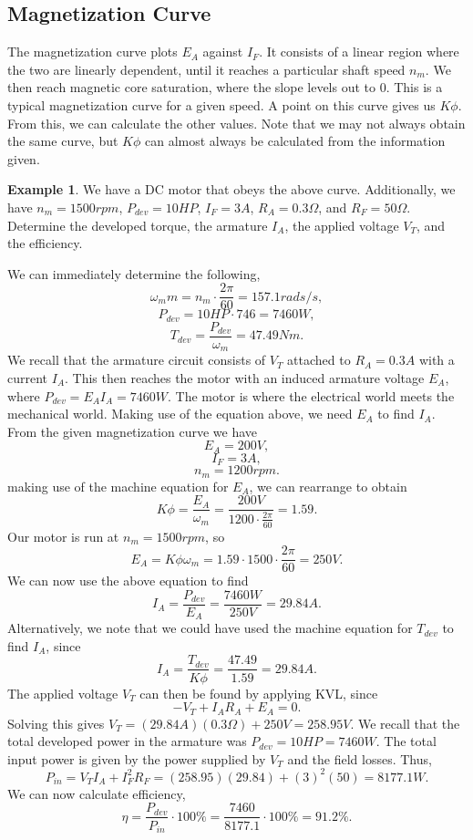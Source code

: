 \documentclass[11pt]{article}
\theoremstyle{plain} %
\theoremstyle{definition}
\theoremstyle{example}
\newtheorem*{example}{Example}
\theoremstyle{remark}
\begin{document}
\subsection{Magnetization Curve}
The magnetization curve plots $E_A$ against $I_F$. It consists of a linear region where the two are linearly dependent, until it reaches a particular shaft speed $n_m$. We then reach magnetic core saturation, where the slope levels out to 0. This is a typical magnetization curve for a given speed. A point on this curve gives us $K\phi$. From this, we can calculate the other values. Note that we may not always obtain the same curve, but $K\phi$ can almost always be calculated from the information given. 

\begin{example}
We have a DC motor that obeys the above curve. Additionally, we have $n_m=1500rpm$, $P_{dev}=10HP$, $I_F = 3A$, $R_A=0.3\Omega$, and $R_F = 50\Omega$. Determine the developed torque, the armature $I_A$, the applied voltage $V_T$, and the efficiency.
\end{example}
We can immediately determine the following,
$$\omega_mm = n_m\cdot \frac{2\pi}{60} = 157.1rads/s,$$
$$P_{dev}=10HP\cdot 746 = 7460W,$$
$$T_{dev} = \frac{P_{dev}}{\omega_m} = 47.49Nm.$$
We recall that the armature circuit consists of $V_T$ attached to $R_A=0.3A$ with a current $I_A$. This then reaches the motor with an induced armature voltage $E_A$, where $P_{dev} = E_AI_A = 7460W$. The motor is where the electrical world meets the mechanical world. Making use of the equation above, we need $E_A$ to find $I_A$. From the given magnetization curve we have 
$$E_A = 200V,$$
$$I_F = 3A,$$
$$n_m=1200rpm.$$
making use of the machine equation for $E_A$, we can rearrange to obtain 
$$K\phi = \frac{E_A}{\omega_m} = \frac{200V}{1200\cdot\frac{2\pi}{60}} = 1.59.$$
Our motor is run at $n_m=1500rpm$, so 
$$E_A = K\phi\omega_m = 1.59\cdot 1500\cdot \frac{2\pi}{60}=250V.$$
We can now use the above equation to find 
$$I_A = \frac{P_{dev}}{E_A} = \frac{7460W}{250V} = 29.84A.$$
Alternatively, we note that we could have used the machine equation for $T_{dev}$ to find $I_A$, since 
$$I_A = \frac{T_{dev}}{K\phi} = \frac{47.49}{1.59} = 29.84A.$$
The applied voltage $V_T$ can then be found by applying KVL, since 
$$-V_T + I_AR_A+E_A = 0.$$
Solving this gives $V_T = (29.84A)(0.3\Omega) + 250V = 258.95V$. 
We recall that the total developed power in the armature was $P_{dev} = 10HP = 7460W$. 
The total input power is given by the power supplied by $V_T$ and the field losses. Thus, 
$$P_{in} = V_TI_A + I_F^2R_F = (258.95)(29.84)+(3)^2(50) = 8177.1W.$$
We can now calculate efficiency,
$$\eta = \frac{P_{dev}}{P_{in}}\cdot 100\% = \frac{7460}{8177.1}\cdot100\% = 91.2\%.$$
\end{document}
